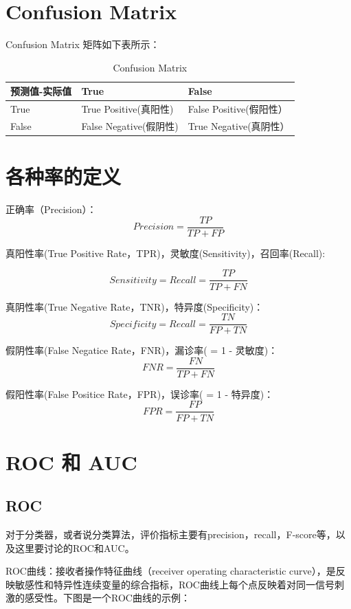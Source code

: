 \documentclass[12pt]{article}
\begin{document}

\section{Confusion Matrix}
Confusion Matrix 矩阵如下表所示：

\begin{table}[h]
\begin{center}  
\begin{tabular}{|l|l|l|}  
\hline  
预测值-实际值 & True & False \\ \hline  
True &	True Positive(真阳性) &	False Positive(假阳性）\\  \hline
False &	False Negative(假阴性) & True Negative(真阴性）\\  \hline
\end{tabular}  
\end{center}
\caption{Confusion Matrix} 
\end{table}

\section{各种率的定义}
正确率（Precision）：
$$Precision = \frac{TP}{TP+FP}$$

真阳性率(True Positive Rate，TPR)，灵敏度(Sensitivity)，召回率(Recall):

$$Sensitivity = Recall= \frac{TP}{TP+FN}$$

真阴性率(True Negative Rate，TNR)，特异度(Specificity)：
$$Specificity = Recall= \frac{TN}{FP+TN}$$

假阴性率(False Negatice Rate，FNR)，漏诊率( = 1 - 灵敏度)：
$$ FNR = \frac{FN}{TP+FN}$$

假阳性率(False Positice Rate，FPR)，误诊率( = 1 - 特异度)：
$$ FPR = \frac{FP}{FP+TN}$$

\section{ROC 和 AUC \cite{ROC-AUC}}
\subsection{ROC}
对于分类器，或者说分类算法，评价指标主要有precision，recall，F-score等，以及这里要讨论的ROC和AUC。

ROC曲线：接收者操作特征曲线（receiver operating characteristic curve），是反映敏感性和特异性连续变量的综合指标，ROC曲线上每个点反映着对同一信号刺激的感受性。下图是一个ROC曲线的示例：
\end{document}
